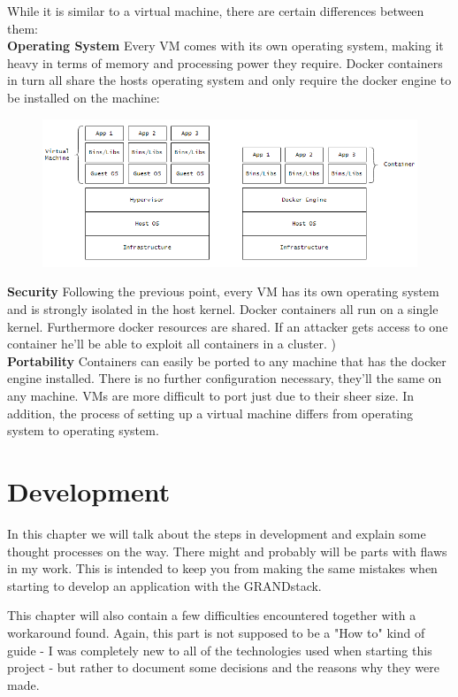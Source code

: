 While it is similar to a virtual machine, there are certain differences between them: \\
\textbf{Operating System} Every VM comes with its own operating system, making it heavy in terms of memory and processing power they require. Docker containers in turn all share the hosts operating system and only require the docker engine to be installed on the machine: \cite{GeekDocker}
\begin{figure}[H]
\centering
\includegraphics[scale=.8]{Bilder/DockerVsVM.png}
\label{ex312}
\end{figure}
\noindent
\textbf{Security} Following the previous point, every VM has its own operating system and is strongly isolated in the host kernel. Docker containers all run on a single kernel. Furthermore docker resources are shared. If an attacker gets access to one container he'll be able to exploit  all containers in a cluster. \cite{GeekDocker}) \\
\textbf{Portability} Containers can easily be ported to any machine that has the docker engine installed. There is no further configuration necessary, they'll the same on any machine. VMs are more difficult to port just due to their sheer size. In addition, the process of setting up a virtual machine differs from operating system to operating system. 

\chapter{Development}
In this chapter we will talk about the steps in development and explain some thought processes on the way. There might and probably will be parts with flaws in my work. This is intended to keep you from making the same mistakes when starting to develop an application with the GRANDstack. 

This chapter will also contain a few difficulties encountered together with a workaround found. Again, this part is not supposed to be a "How to" kind of guide - I was completely new to all of the technologies used when starting this project - but rather to document some decisions and the reasons why they were made.

